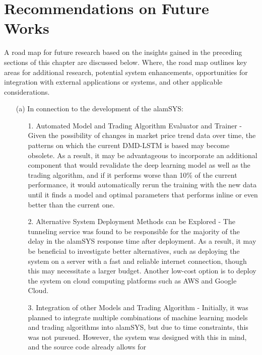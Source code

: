 \section{Recommendations on Future Works}
\label{sec:recommendations}
A road map for future research based 
on the insights gained in the preceding sections of this chapter
are discussed below. Where, the road map outlines key 
areas for additional research, potential system enhancements, opportunities 
for integration with external applications or systems, and other applicable considerations.

\begin{itemize}
    \item[(a)] In connection to the development of the alamSYS:
        \begin{itemize}
            \item[1.] Automated Model and Trading Algorithm Evaluator and Trainer - 
            Given the possibility of changes in market price trend data 
            over time, the patterns on which the current DMD-LSTM is based may 
            become obsolete. As a result, it may be advantageous to incorporate 
            an additional component that would revalidate the deep learning 
            model as well as the trading algorithm, and if it performs worse 
            than 10\% of the current performance, it would automatically 
            rerun the training with the new data until it finds a model and 
            optimal parameters that performs inline or even better than the 
            current one.
            \item[2.] Alternative System Deployment Methods can be Explored - 
            The tunneling service was found to be responsible for the 
            majority of the delay in the alamSYS response time after deployment. 
            As a result, it may be beneficial to investigate better alternatives, 
            such as deploying the system on a server with a fast and reliable 
            internet connection, though this may necessitate a larger budget. 
            Another low-cost option is to deploy the system on cloud computing 
            platforms such as AWS and Google Cloud.
            \item[3.] Integration of other Models and Trading Algorithm - 
            Initially, it was planned to integrate multiple combinations of 
            machine learning models and trading algorithms into alamSYS, but due 
            to time constraints, this was not pursued. However, the system was 
            designed with this in mind, and the source code already allows for 

\end{itemize}
\end{itemize}
